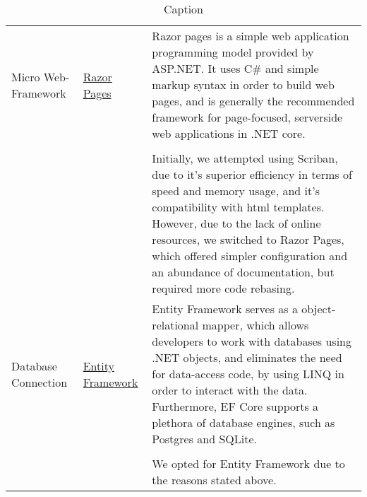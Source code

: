 \begin{table}[H]
    \centering
    \begin{tabular}{|p{}|p{} | p{}|}
        \hline
        Micro Web-Framework & \href{https://learn.microsoft.com/en-us/aspnet/core/razor-pages/?view=aspnetcore-8.0&tabs=visual-studio}{Razor Pages} & Razor pages is a simple web application programming model provided by ASP.NET. It uses C\# and simple markup syntax in order to build web pages, and is generally the recommended framework for page-focused, serverside web applications in .NET core.\\
        && \\
        && Initially, we attempted using Scriban, due to it's superior efficiency in terms of speed and memory usage, and it's compatibility with html templates. However, due to the lack of online resources, we switched to Razor Pages, which offered simpler configuration and an abundance of documentation, but required more code rebasing.\\
        \hline
        Database Connection & \href{https://learn.microsoft.com/en-us/ef/core/}{Entity Framework} & Entity Framework serves as a object-relational mapper, which allows developers to work with databases using .NET objects, and eliminates the need for data-access code, by using LINQ in order to interact with the data. Furthermore, EF Core supports a plethora of database engines, such as Postgres and SQLite.\\
        &&\\
        && We opted for Entity Framework due to the reasons stated above.\\
        \hline
    \end{tabular}
    \caption{Caption}
    \label{tab:tools1}
\end{table}